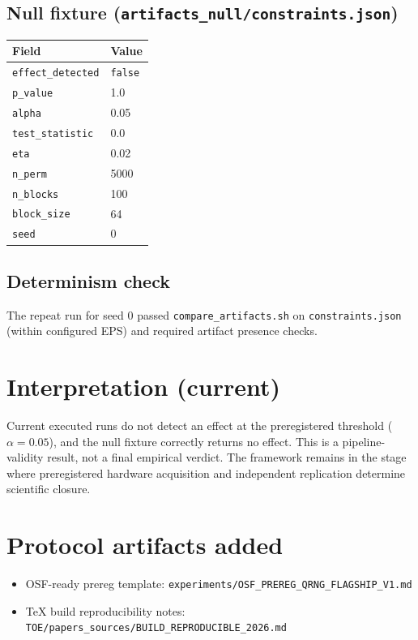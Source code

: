 \documentclass[11pt]{article}
\begin{document}
\subsection{Null fixture (\texttt{artifacts\_null/constraints.json})}
\begin{center}
\begin{tabular}{ll}
\toprule
Field & Value \\
\midrule
\texttt{effect\_detected} & \texttt{false} \\
\texttt{p\_value} & 1.0 \\
\texttt{alpha} & 0.05 \\
\texttt{test\_statistic} & 0.0 \\
\texttt{eta} & 0.02 \\
\texttt{n\_perm} & 5000 \\
\texttt{n\_blocks} & 100 \\
\texttt{block\_size} & 64 \\
\texttt{seed} & 0 \\
\bottomrule
\end{tabular}
\end{center}

\subsection{Determinism check}
The repeat run for seed 0 passed \texttt{compare\_artifacts.sh} on \texttt{constraints.json} (within configured EPS) and required artifact presence checks.

\section{Interpretation (current)}
Current executed runs do not detect an effect at the preregistered threshold ($\alpha=0.05$), and the null fixture correctly returns no effect. This is a pipeline-validity result, not a final empirical verdict. The framework remains in the stage where preregistered hardware acquisition and independent replication determine scientific closure.

\section{Protocol artifacts added}
\begin{itemize}
\item OSF-ready prereg template: \texttt{experiments/OSF\_PREREG\_QRNG\_FLAGSHIP\_V1.md}
\item TeX build reproducibility notes: \texttt{TOE/papers\_sources/BUILD\_REPRODUCIBLE\_2026.md}
\end{itemize}
\end{document}
